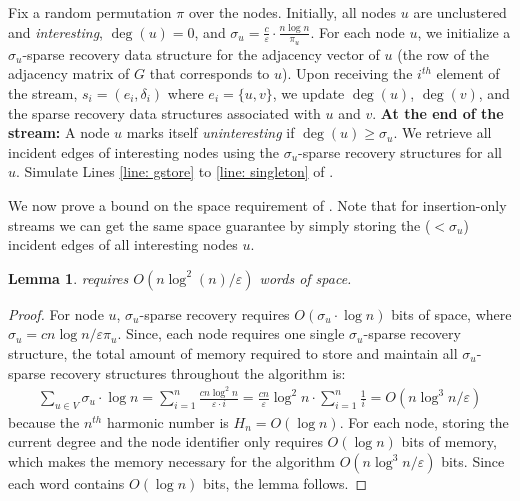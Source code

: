 \documentclass[10pt,a4paper]{article}
\newtheorem{lemma}{Lemma}[section]
\newcommand{\truncatedpivot}{\textrm{Truncated-Pivot}\xspace}
\newcommand{\eps}{\ensuremath{\varepsilon}}
\let\oldnl\nl%
\newcommand{\nonl}{\renewcommand{\nl}{\let\nl\oldnl}}%
\begin{document}
{\begin{algorithm}[tbh]
   \setcounter{AlgoLine}{0}
\caption{Dynamic Semi-Streaming \truncatedpivot}\label{alg:dynamic-delta-pivot}
    Fix a random permutation $\pi$ over the nodes. \;
    Initially, all nodes $u$ are unclustered and \emph{interesting}, $\deg(u) = 0$, and $\sigma_u = \frac{c}{\eps} \cdot \frac{n\log n}{\pi_u}$. \;
    For each node $u$, we initialize a $\sigma_u$-sparse recovery data structure for the adjacency vector of $u$ (the row of the adjacency matrix of $G$ that corresponds to $u$). \;
    Upon receiving the $i^{th}$ element of the stream, $s_i = (e_i, \delta_i)$ where $e_i=\{u,v\}$, we update $\deg(u)$, $\deg(v)$, and the sparse recovery data structures associated with $u$ and $v$. \;
  \nonl  \textbf{At the end of the stream:}\;
    A node $u$ marks itself \emph{uninteresting} if $\deg(u) \geq \sigma_{u}$. \;
    We retrieve all incident edges of interesting nodes using the ${\sigma_u}$-sparse recovery structures for all $u$. \;
    Simulate Lines \ref{line: gstore} to \ref{line: singleton} of .\;
\end{algorithm} 
We now prove a bound on the space requirement of . Note that for insertion-only streams we can get the same space guarantee by simply storing the ($<\sigma_u$) incident edges of all interesting nodes $u$.

\begin{lemma}\label{lem: space-req-dynamic-alg}
     requires $O(n\log^2 (n)/\eps)$ words of space. 
\end{lemma}
\begin{proof}
    For node $u$, ${\sigma_u}$-sparse recovery requires $O(\sigma_u\cdot\log n)$ bits of space, where $\sigma_u = c n\log n / \eps \pi_u$. 
    Since, each node requires one single ${\sigma_u}$-sparse recovery structure, the total amount of memory required to store and maintain all ${\sigma_u}$-sparse recovery structures throughout the algorithm is: 
    \begin{align*}
        \sum_{u\in V} \sigma_u\cdot \log n = \sum_{i=1}^n \frac{c n\log^2 n}{\eps\cdot i} = \frac{cn}{\eps}\log^2n \cdot \sum_{i=1}^n\frac{1}{i} = O(n\log^3 n/\eps)
    \end{align*}
    because the $n^{th}$ harmonic number is $H_n = O(\log n)$. 
    For each node, storing the current degree and the node identifier only requires $O(\log n)$ bits of memory, which makes the memory necessary for the algorithm $O(n\log^3 n/\eps)$ bits. 
    Since each word contains $O(\log n)$ bits, the lemma follows.
\end{proof}


}
\end{document}
